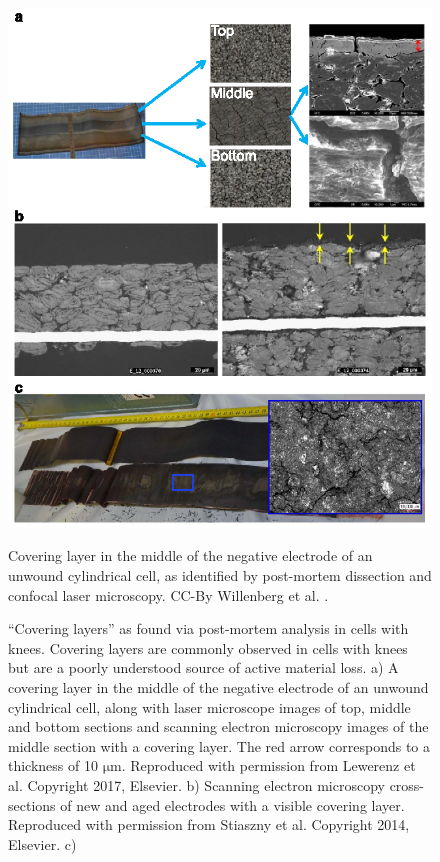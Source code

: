 \documentclass[journal=jpclcd,manuscript=article]{achemso}
\begin{document}
\begin{figure}[ht!]
\centering
\includegraphics[scale = 1.0]{figures/CoveringLayers.eps}
\caption{``Covering layers'' as found via post-mortem analysis in cells with knees. Covering layers are commonly observed in cells with knees but are a poorly understood source of active material loss.
a) A covering layer in the middle of the negative electrode of an unwound cylindrical cell, along with laser microscope images of top, middle and bottom sections and scanning electron microscopy images of the middle section with a covering layer. The red arrow corresponds to a thickness of 10 $\mathrm{\mu m}$. Reproduced with permission from Lewerenz et al. \cite{lewerenz_post-mortem_2017} Copyright 2017, Elsevier. b) Scanning electron microscopy cross-sections of new and aged electrodes with a visible covering layer. Reproduced with permission from Stiaszny et al. \cite{stiaszny_electrochemical_2014} Copyright 2014, Elsevier. c) } Covering layer in the middle of the negative electrode of an unwound cylindrical cell, as identified by post-mortem dissection and confocal laser microscopy. CC-By Willenberg et al. \cite{willenberg_development_2020}.
\label{fig:covering_layers}
\end{figure}
\end{document}

